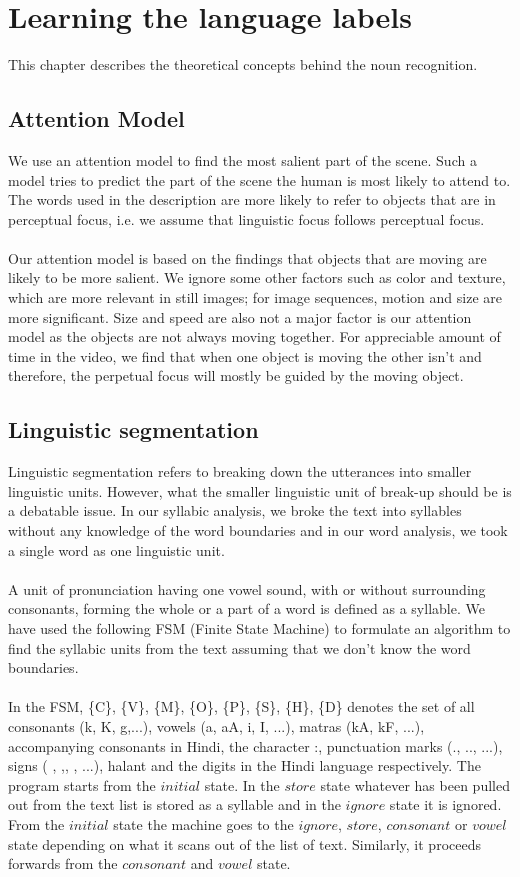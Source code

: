 \documentclass[12pt, a4paper]{report}
\begin{document}
\chapter{Learning the language labels}
This chapter describes the theoretical concepts behind the noun recognition.
\section{Attention Model}
We use an attention model to find the most salient part of the scene. Such a model tries to predict the part of the scene the human is most likely to attend to. The words used in the description are more likely to refer to objects that are in perceptual focus, i.e. we assume that linguistic focus follows perceptual focus.\\
\\
Our attention model is based on the findings that objects that are moving are likely to be more salient. We ignore some other factors such as color and texture, which are more relevant in still images; for image sequences, motion and size are more significant. Size and speed are also not a major factor is our attention model as the objects are not always moving together. For appreciable amount of time in the video, we find that when one object is moving the other isn’t and therefore, the perpetual focus will mostly be guided by the moving object.

\section{Linguistic segmentation}
Linguistic segmentation refers to breaking down the utterances into smaller linguistic units. However, what the smaller linguistic unit of break-up should be is a debatable issue. In our syllabic analysis, we broke the text into syllables without any knowledge of the word boundaries and in our word analysis, we took a single word as one linguistic unit.\\
\\
A unit of pronunciation having one vowel sound, with or without surrounding consonants, forming the whole or a part of a word is defined as a syllable. We have used the following FSM (Finite State Machine) to formulate an algorithm to find the syllabic units from the text assuming that we don’t know the word boundaries.\\
\\
In the FSM, \{C\}, \{V\}, \{M\}, \{O\}, \{P\}, \{S\}, \{H\}, \{D\} denotes the set of all consonants ({\dn k}, {\dn K}, {\dn g},...), vowels ({\dn a}, {\dn aA}, {\dn i}, {\dn I}, ...), matras ({\dn kA}, {\dn kF}, ...), accompanying consonants in Hindi, the character {\dn :}, punctuation marks ({\dn .}, {\dn ..}, ...), signs ( {\dn \2}, {\dn ,}, {\dn \1}, ...), halant and the digits in the Hindi language respectively. The program starts from the $initial$ state. In the $store$ state whatever has been pulled out from the text list is stored as a syllable and in the $ignore$ state it is ignored. From the $initial$ state the machine goes to the $ignore$, $store$, $consonant$ or $vowel$ state depending on what it scans out of the list of text. Similarly, it proceeds forwards from the $consonant$ and $vowel$ state.
\end{document}
